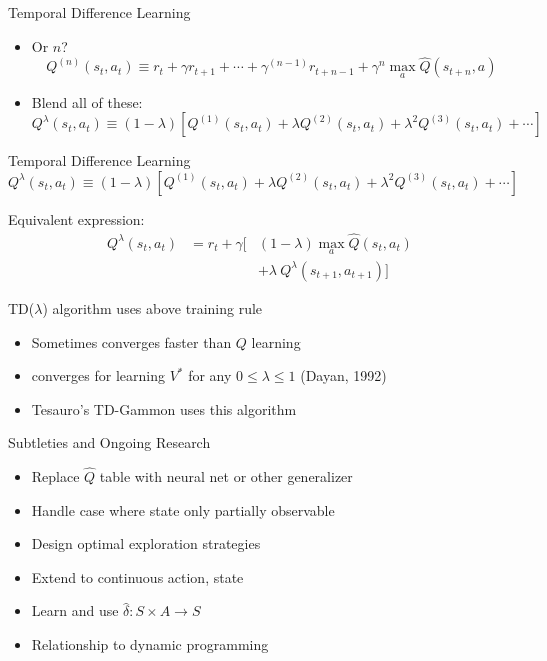 \documentclass[%
pdf,
colorBG,
slideColor,
tcrico,
]{prosper}
\begin{document}
\begin{slide}{Temporal Difference Learning } 

\begin{itemize}
\item  Or $n$?
\[ Q^{(n)}(s_t,a_t) \equiv r_t + \gamma r_{t+1} + \cdots
+ \gamma^{(n-1)}r_{t+n-1} + \gamma^n \max_{a}\hat{Q}(s_{t+n},a) \]
\item  Blend all of these:
\[Q^{\lambda}(s_{t},a_{t})  \equiv (1- \lambda) \left[
Q^{(1)}(s_t,a_t) + \lambda Q^{(2)}(s_t,a_t) + \lambda^2 Q^{(3)}(s_t,a_t) +
\cdots \right] \]
\end{itemize}
\end{slide}

\begin{slide}{Temporal Difference Learning } 
\tiny
\[Q^{\lambda}(s_{t},a_{t})  \equiv (1- \lambda) \left[
Q^{(1)}(s_t,a_t) + \lambda Q^{(2)}(s_t,a_t) + \lambda^2 Q^{(3)}(s_t,a_t) +
\cdots \right] \]

Equivalent expression:
\begin{eqnarray*}
 Q^{\lambda}(s_{t},a_{t}) & = r_{t} + \gamma [ & (1 -
\lambda)
\max_{a}\hat{Q}(s_{t},a_{t}) \\
 & & + \lambda \ Q^{\lambda}(s_{t+1},a_{t+1})]
\end{eqnarray*}


TD($\lambda$) algorithm uses above training rule
\begin{itemize}
\item Sometimes converges faster than $Q$ learning
\item converges for learning $V^*$ for any $0 \leq
\lambda \leq 1$ (Dayan, 1992)
\item Tesauro's TD-Gammon uses this algorithm
\end{itemize}
\end{slide}

\begin{slide}{Subtleties and Ongoing Research } 

\begin{itemize}
\item
Replace $\hat{Q}$ table with neural net or other generalizer
\item
Handle case where state only partially observable
\item
Design optimal exploration strategies
\item
Extend to continuous action, state
\item
Learn and use $\hat{\delta}: S \times A \rightarrow S$
\item 
Relationship to dynamic programming
\end{itemize}
\end{slide}
\end{document}
